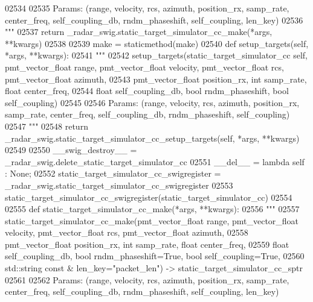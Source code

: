 \begin{DoxyCode}
{{{{{{{{{{02534 \textcolor{stringliteral}{}
02535 \textcolor{stringliteral}{        Params: (range, velocity, rcs, azimuth, position\_rx, samp\_rate, center\_freq, self\_coupling\_db,
       rndm\_phaseshift, self\_coupling, len\_key)}
02536 \textcolor{stringliteral}{        """}
02537         \textcolor{keywordflow}{return} \_radar\_swig.static\_target\_simulator\_cc\_make(*args, **kwargs)
02538 
02539     make = staticmethod(make)
02540     \textcolor{keyword}{def }setup_targets(self, *args, **kwargs):
02541         \textcolor{stringliteral}{"""}
02542 \textcolor{stringliteral}{        setup\_targets(static\_target\_simulator\_cc self, pmt\_vector\_float range, pmt\_vector\_float velocity,
       pmt\_vector\_float rcs, pmt\_vector\_float azimuth, }
02543 \textcolor{stringliteral}{            pmt\_vector\_float position\_rx, int samp\_rate, float center\_freq, }
02544 \textcolor{stringliteral}{            float self\_coupling\_db, bool rndm\_phaseshift, bool self\_coupling)}
02545 \textcolor{stringliteral}{}
02546 \textcolor{stringliteral}{        Params: (range, velocity, rcs, azimuth, position\_rx, samp\_rate, center\_freq, self\_coupling\_db,
       rndm\_phaseshift, self\_coupling)}
02547 \textcolor{stringliteral}{        """}
02548         \textcolor{keywordflow}{return} \_radar\_swig.static\_target\_simulator\_cc\_setup\_targets(self, *args, **kwargs)
02549 
02550     \_\_swig\_destroy\_\_ = \_radar\_swig.delete\_static\_target\_simulator\_cc
02551     \_\_del\_\_ = \textcolor{keyword}{lambda} self : \textcolor{keywordtype}{None};
02552 static\_target\_simulator\_cc\_swigregister = \_radar\_swig.static\_target\_simulator\_cc\_swigregister
02553 static_target_simulator_cc_swigregister(static\_target\_simulator\_cc)
02554 
02555 \textcolor{keyword}{def }static_target_simulator_cc_make(*args, **kwargs):
02556   \textcolor{stringliteral}{"""}
02557 \textcolor{stringliteral}{    static\_target\_simulator\_cc\_make(pmt\_vector\_float range, pmt\_vector\_float velocity, pmt\_vector\_float
       rcs, pmt\_vector\_float azimuth, }
02558 \textcolor{stringliteral}{        pmt\_vector\_float position\_rx, int samp\_rate, float center\_freq, }
02559 \textcolor{stringliteral}{        float self\_coupling\_db, bool rndm\_phaseshift=True, bool self\_coupling=True, }
02560 \textcolor{stringliteral}{        std::string const & len\_key="packet\_len") -> static\_target\_simulator\_cc\_sptr}
02561 \textcolor{stringliteral}{}
02562 \textcolor{stringliteral}{    Params: (range, velocity, rcs, azimuth, position\_rx, samp\_rate, center\_freq, self\_coupling\_db,
       rndm\_phaseshift, self\_coupling, len\_key)}
}}}}}}}}}}
\end{DoxyCode}
